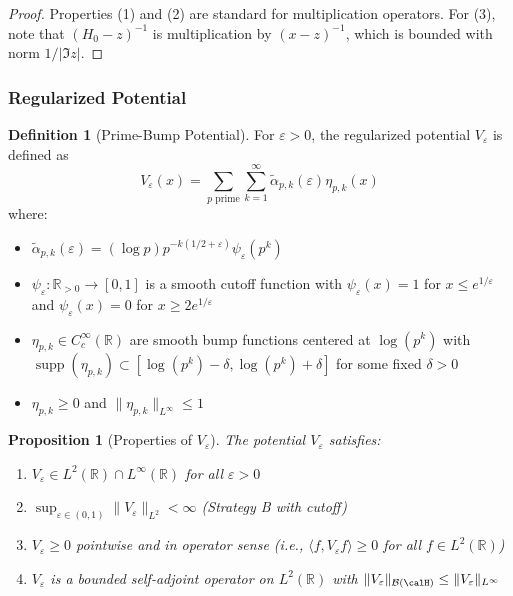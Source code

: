 ﻿\documentclass[12pt,a4paper]{article}
\newtheorem{proposition}[theorem]{Proposition}
\theoremstyle{definition}
\newtheorem{definition}[theorem]{Definition}
\theoremstyle{remark}
\newcommand{\RR}{\mathbb{R}}
\newcommand{\supp}{\operatorname{supp}}
\begin{document}
\begin{proof}
Properties (1) and (2) are standard for multiplication operators. For (3), note that $(H_0 - z)^{-1}$ is multiplication by $(x - z)^{-1}$, which is bounded with norm $1/|\Im z|$.
\end{proof}

\subsubsection{Regularized Potential}

\begin{definition}[Prime-Bump Potential]
\label{def:prime-bump-potential}
For $\varepsilon > 0$, the regularized potential $V_\varepsilon$ is defined as
\[
V_\varepsilon(x) = \sum_{p \text{ prime}} \sum_{k=1}^\infty \widetilde{\alpha}_{p,k}(\varepsilon) \eta_{p,k}(x)
\]
where:
\begin{itemize}
\item $\widetilde{\alpha}_{p,k}(\varepsilon) = (\log p) p^{-k(1/2+\varepsilon)} \psi_\varepsilon(p^k)$
\item $\psi_\varepsilon : \RR_{>0} \to [0,1]$ is a smooth cutoff function with $\psi_\varepsilon(x) = 1$ for $x \leq e^{1/\varepsilon}$ and $\psi_\varepsilon(x) = 0$ for $x \geq 2e^{1/\varepsilon}$
\item $\eta_{p,k} \in C_c^\infty(\RR)$ are smooth bump functions centered at $\log(p^k)$ with $\supp(\eta_{p,k}) \subset [\log(p^k) - \delta, \log(p^k) + \delta]$ for some fixed $\delta > 0$
\item $\eta_{p,k} \geq 0$ and $\|\eta_{p,k}\|_{L^\infty} \leq 1$
\end{itemize}
\end{definition}

\begin{proposition}[Properties of $V_\varepsilon$]
\label{prop:V-epsilon-properties}
The potential $V_\varepsilon$ satisfies:
\begin{enumerate}
\item $V_\varepsilon \in L^2(\RR) \cap L^\infty(\RR)$ for all $\varepsilon > 0$
\item $\sup_{\varepsilon \in (0,1)} \|V_\varepsilon\|_{L^2} < \infty$ (Strategy B with cutoff)
\item $V_\varepsilon \geq 0$ pointwise and in operator sense (i.e., $\langle f, V_\varepsilon f \rangle \geq 0$ for all $f \in L^2(\RR)$)
\item $V_\varepsilon$ is a bounded self-adjoint operator on $L^2(\RR)$ with $\|V_\varepsilon\|_{\mathcal{B}(\calH)} \leq \|V_\varepsilon\|_{L^\infty}$
\end{enumerate}
\end{proposition}
\end{document}
